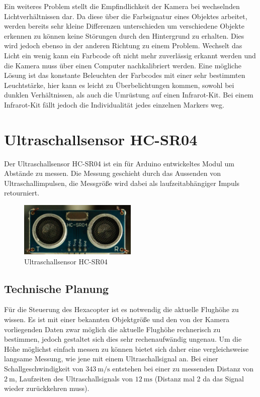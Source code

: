   Ein weiteres Problem stellt die Empfindlichkeit der Kamera bei wechselnden Lichtverhältnissen dar. Da diese über die Farbsignatur eines Objektes arbeitet, werden bereits
  sehr kleine Differenzen unterschieden um verschiedene Objekte erkennen zu können \bzw keine Störungen durch den Hintergrund zu erhalten. Dies wird jedoch ebenso in der
  anderen Richtung zu einem Problem. Wechselt das Licht ein wenig kann ein Farbcode oft nicht mehr zuverlässig erkannt werden und die Kamera muss über einen Computer nachkalibriert
  werden. Eine mögliche Lösung ist das konstante Beleuchten der Farbcodes mit einer sehr bestimmten Leuchtstärke, hier kann es leicht zu Überbelichtungen kommen, sowohl bei
  dunklen Verhältnissen, als auch die Umrüstung auf einen \gls{Infrarot}-Kit. Bei einem Infrarot-Kit fällt jedoch die Individualität jedes einzelnen Markers weg.

\section{Ultraschallsensor HC-SR04}
Der Ultraschallsensor HC-SR04 ist ein für Arduino entwickeltes Modul um Abstände zu messen. Die Messung geschieht durch das Aussenden von Ultraschallimpulsen,
die Messgröße wird dabei als laufzeitabhängiger Impuls retourniert.

\begin{figure}[tbh]
  \begin{centering}
    \includegraphics[width = 0.5\textwidth]{Bilder/Ultraschallsensor}
  \par\end{centering}
  \caption{Ultraschallsensor HC-SR04}
  \label{Ultraschallsensor}
\end{figure}

  \subsection{Technische Planung}
  Für die Steuerung des Hexacopter ist es notwendig die aktuelle Flughöhe zu wissen.
  Es ist mit einer bekannten Objektgröße und den von der Kamera vorliegenden Daten zwar möglich die aktuelle Flughöhe rechnerisch zu bestimmen,
  jedoch gestaltet sich dies sehr rechenaufwändig \bzw ungenau. Um die Höhe möglichst einfach messen zu können bietet sich daher eine vergleichsweise langsame Messung,
  wie jene mit einem Ultraschallsignal an.
  Bei einer Schallgeschwindigkeit von $\SI{343}{\meter\per\second}$ entstehen bei einer zu messenden Distanz von $\SI{2}{\meter}$,
  Laufzeiten des Ultraschallsignals von \ca $\SI{12}{\milli\second}$ (Distanz mal 2 da das Signal wieder zurückkehren muss).

